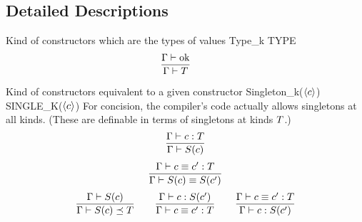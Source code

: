 \documentclass[12pt,twoside,fleqn]{article}
\begin{document}
\irule
  {}
  {\subkind{\context}{\kind}{\kind}}

\irule
  {\qquad
   }
  {}


\subsection{Detailed Descriptions}

  {Kind of constructors which are the types of values}
  {\ktype}
  {Type\_k}
  {TYPE}
  {}
  {\[\frac
      {{\Gamma}\vdash\mbox{ok}}
      {\Gamma\vdash T}\qquad
   \]}

  {Kind of constructors equivalent to a given constructor}
  {\ksingleton{\constructor}}
  {Singleton\_k($\langle{c}\rangle$)}
  {SINGLE\_K($\langle{c}\rangle$)}
  {For concision, the compiler's code actually allows singletons at
   all kinds.  (These are definable in terms of singletons at kinds
   $T$.)}
  {\[
     \frac
       {\Gamma\vdash c : T}
       {\Gamma\vdash S(c)}
   \]
   \[
   \frac
    {\Gamma\vdash c \equiv c' : T}
    {\Gamma\vdash S(c) \equiv S(c')}
   \]
   \[
   \frac
    {\Gamma\vdash S(c)}
    {\mbox{$\Gamma\vdash S(c) \preceq T$}}
   \qquad
   \frac
    {\Gamma\vdash c : S(c')}
    {\Gamma\vdash c \equiv c' : T}
   \qquad
   \frac
    {\Gamma\vdash c \equiv c' : T}
    {\Gamma\vdash c : S(c')}
   \]}
\end{document}
